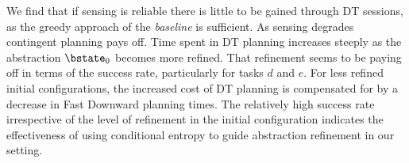 We find that if sensing is reliable there is little to be gained
through DT sessions, as the greedy approach of the {\em baseline} is
sufficient. As sensing degrades contingent planning pays off.  Time
spent in DT planning increases steeply as the abstraction $\bstate_0$
becomes more refined.  That refinement seems to be paying off in terms
of the success rate, particularly for tasks $d$ and $e$. For less
refined initial configurations, the increased cost of DT
planning is compensated for by a decrease in Fast Downward planning
times. The relatively high success rate irrespective of the level of
refinement in the initial configuration indicates the effectiveness of
using conditional entropy to guide abstraction refinement in our
setting.

